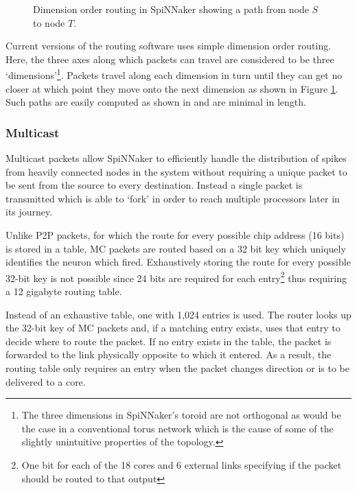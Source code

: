 				\begin{figure}
					\center
					
					\caption[Dimension order routing in SpiNNaker]{Dimension order routing
					in SpiNNaker showing a path from node $S$ to node $T$.}
					\label{fig:dimension-order-routing}
				\end{figure}
				
				Current versions of the routing software uses simple dimension order
				routing. Here, the three axes along which packets can travel are
				considered to be three `dimensions'\footnote{The three dimensions in
				SpiNNaker's toroid are not orthogonal as would be the case in a
				conventional torus network which is the cause of some of the slightly
				unintuitive properties of the topology.}. Packets travel along each
				dimension in turn until they can get no closer at which point they move
				onto the next dimension as shown in Figure
				\ref{fig:dimension-order-routing}. Such paths are easily computed as
				shown in \cite{nocetti02} and are minimal in length.
			
			\subsubsection{Multicast}
				
				
				Multicast packets allow SpiNNaker to efficiently handle the distribution
				of spikes from heavily connected nodes in the system without requiring a
				unique packet to be sent from the source to every destination. Instead a
				single packet is transmitted which is able to `fork' in order to reach
				multiple processors later in its journey.
				
				Unlike P2P packets, for which the route for every possible chip address
				(16 bits) is stored in a table, MC packets are routed based on a 32 bit
				key which uniquely identifies the neuron which fired. Exhaustively
				storing the route for every possible 32-bit key is not possible since 24
				bits are required for each entry\footnote{One bit for each of the 18
				cores and 6 external links specifying if the packet should be routed to
				that output} thus requiring a 12 gigabyte routing table.
				
				Instead of an exhaustive table, one with 1,024 entries is used. The
				router looks up the 32-bit key of MC packets and, if a matching entry
				exists, uses that entry to decide where to route the packet. If no entry
				exists in the table, the packet is forwarded to the link physically
				opposite to which it entered. As a result, the routing table only
				requires an entry when the packet changes direction or is to be
				delivered to a core.
				
